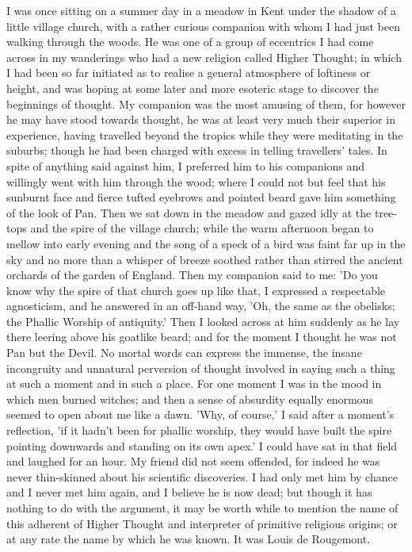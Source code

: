 
I was once sitting on a summer day in a meadow in Kent under the shadow of a little village church, with a rather curious companion with whom I had just been walking through the woods. He was one of a group of eccentrics I had come across in my wanderings who had a new religion called Higher Thought; in which I had been so far initiated as to realise a general atmosphere of loftiness or height, and was hoping at some later and more esoteric stage to discover the beginnings of thought. My companion was the most amusing of them, for however he may have stood towards thought, he was at least very much their superior in experience, having travelled beyond the tropics while they were meditating in the suburbs; though he had been charged with excess in telling travellers' tales. In spite of anything said against him, I preferred him to his companions and willingly went with him through the wood; where I could not but feel that his sunburnt face and fierce tufted eyebrows and pointed beard gave him something of the look of Pan. Then we sat down in the meadow and gazed idly at the tree-tops and the spire of the village church; while the warm afternoon began to mellow into early evening and the song of a speck of a bird was faint far up in the sky and no more than a whisper of breeze soothed rather than stirred the ancient orchards of the garden of England. Then my companion said to me: 'Do you know why the spire of that church goes up like that, I expressed a respectable agnosticism, and he answered in an off-hand way, 'Oh, the same as the obelisks; the Phallic Worship of antiquity.' Then I looked across at him suddenly as he lay there leering above his goatlike beard; and for the moment I thought he was not Pan but the Devil. No mortal words can express the immense, the insane incongruity and unnatural perversion of thought involved in saying such a thing at such a moment and in such a place. For one moment I was in the mood in which men burned witches; and then a sense of absurdity equally enormous seemed to open about me like a dawn. 'Why, of course,' I said after a moment's reflection, 'if it hadn't been for phallic worship, they would have built the spire pointing downwards and standing on its own apex.' I could have sat in that field and laughed for an hour. My friend did not seem offended, for indeed he was never thin-skinned about his scientific discoveries. I had only met him by chance and I never met him again, and I believe he is now dead; but though it has nothing to do with the argument, it may be worth while to mention the name of this adherent of Higher Thought and interpreter of primitive religious origins; or at any rate the name by which he was known. It was Louis de Rougemont.

